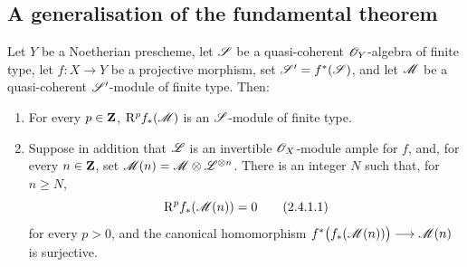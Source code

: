 \subsection{A generalisation of the fundamental theorem}
\label{subsection:III.2.4}

\begin{theorem}[2.4.1]
\label{III.2.4.1}
Let $Y$ be a Noetherian prescheme, let $\mathscr{S}$ be a quasi-coherent $\mathscr{O}_Y$-algebra of finite type, let $f:X\longrightarrow Y$
be a projective morphism, set $\mathscr{S}'=f^*(\mathscr{S})$, and let $\mathscr{M}$ be a quasi-coherent $\mathscr{S}'$-module of finite type.
Then:
\begin{enumerate}
  \item[\textup{(i)}] For every $p\in\mathbf{Z}$, $\mathrm{R}^p f_*(\mathscr{M})$ is an $\mathscr{S}$-module of finite type.

  \item[\textup{(ii)}] Suppose in addition that $\mathscr{L}$ is an invertible $\mathscr{O}_X$-module ample for $f$, and, for every $n\in\mathbf{Z}$, set $\mathscr{M}(n)=\mathscr{M}\otimes\mathscr{L}^{\otimes n}$.
  There is an integer $N$ such that, for $n\geq N$,
  \[
  \label{III.2.4.1.1}
    \mathrm{R}^p f_*(\mathscr{M}(n))=0
    \tag{2.4.1.1}
  \]
  for every $p>0$, and the canonical homomorphism $f^*\bigl(f_*(\mathscr{M}(n))\bigr)\longrightarrow\mathscr{M}(n)$
   is surjective.
\end{enumerate}
\end{theorem}

